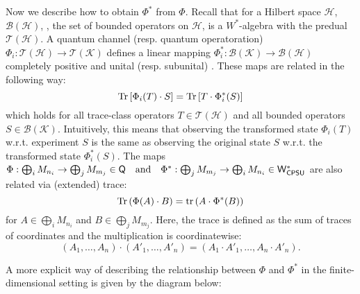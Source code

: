 Now we describe how to obtain  $\Phi^*$ from $\Phi$. 
Recall that for a Hilbert space \( \mathcal{H} \), \( \mathcal{B}(\mathcal{H}) \), \ie, the set of bounded operators on \( \mathcal{H} \), is a \( W^* \)-algebra with the predual \( \mathcal{T}(\mathcal{H}) \).
A quantum channel (resp. quantum operatoration) $\Phi_i: \mathcal{T}(\mathcal{H})  \to \mathcal{T}(\mathcal{K})$ defines a linear mapping 
$\Phi_i^*: \mathcal{B}(\mathcal{K}) \to \mathcal{B}(\mathcal{H})$ completely positive and unital (resp. subunital) \cite[Proposition 5.1,]{choSemanticsQuantumProgramming2016}. These maps are related in the following way:
\begin{equation*}
\text{Tr}\left[\Phi_i(T) \cdot S\right] = \text{Tr} \left[T \cdot \Phi_i^*(S)\right]
\end{equation*}
which holds for all trace-class operators $T \in \mathcal{T}(\mathcal{H})$ and all bounded operators $S \in \mathcal{B}(\mathcal{K})$.
Intuitively, this means that observing the transformed state $\Phi_i(T)$ w.r.t. experiment $S$ is the same as observing the original state $S$ w.r.t. the transformed state $\Phi_i^*(S)$.
The maps 
\( \Phi :  \bigoplus_i M_{n_i} \to \bigoplus_j M_{m_j} \in \mathsf{Q} \quad \text{and} \quad \Phi^* : \bigoplus_j M_{m_j} \to \bigoplus_i M_{n_i} \in \mathsf{W^*_{CPSU}} \)
are also related via (extended) trace:
\[
\text{Tr} \left( \Phi(A) \cdot B \right) = \operatorname{tr} \left( A \cdot \Phi^*(B) \right)
\]
for \(A \in \bigoplus_i M_{n_i}\) and \(B \in \bigoplus_j M_{m_j}\). Here, the trace is defined as the sum of traces of coordinates and the multiplication is coordinatewise:
\[
(A_1, \ldots, A_n) \cdot (A'_1, \ldots,A'_n ) = (A_1 \cdot A'_1, \ldots, A_n \cdot A'_n).
\]


A more explicit way of describing the relationship between $\Phi$ and $\Phi^*$ in the finite-dimensional setting is given by the diagram below:

